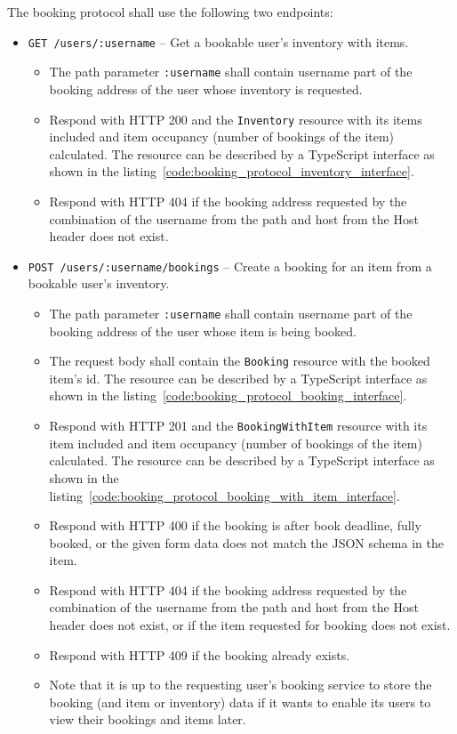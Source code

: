 The booking protocol shall use the following two endpoints:
\begin{itemize}
    \item \texttt{GET /users/:username} -- Get a bookable user's inventory with items.
    \begin{itemize}
        \item The path parameter \texttt{:username} shall contain username part of the booking address of the user whose inventory is requested.
        \item Respond with HTTP 200 and the \texttt{Inventory} resource with its items included and item occupancy (number of bookings of the item) calculated. The resource can be described by a TypeScript interface as shown in the listing~\ref{code:booking_protocol_inventory_interface}.
        \item Respond with HTTP 404 if the booking address requested by the combination of the username from the path and host from the Host header does not exist.
    \end{itemize}
    \item \texttt{POST /users/:username/bookings} -- Create a booking for an item from a bookable user's inventory.
    \begin{itemize}
        \item The path parameter \texttt{:username} shall contain username part of the booking address of the user whose item is being booked.
        \item The request body shall contain the \texttt{Booking} resource with the booked item's id. The resource can be described by a TypeScript interface as shown in the listing~\ref{code:booking_protocol_booking_interface}.
        \item Respond with HTTP 201 and the \texttt{BookingWithItem} resource with its item included and item occupancy (number of bookings of the item) calculated. The resource can be described by a TypeScript interface as shown in the listing~\ref{code:booking_protocol_booking_with_item_interface}.
        \item Respond with HTTP 400 if the booking is after book deadline, fully booked, or the given form data does not match the JSON schema in the item.
        \item Respond with HTTP 404 if the booking address requested by the combination of the username from the path and host from the Host header does not exist, or if the item requested for booking does not exist.
        \item Respond with HTTP 409 if the booking already exists.
        \item Note that it is up to the requesting user's booking service to store the booking (and item or inventory) data if it wants to enable its users to view their bookings and items later.
    \end{itemize}
\end{itemize}

